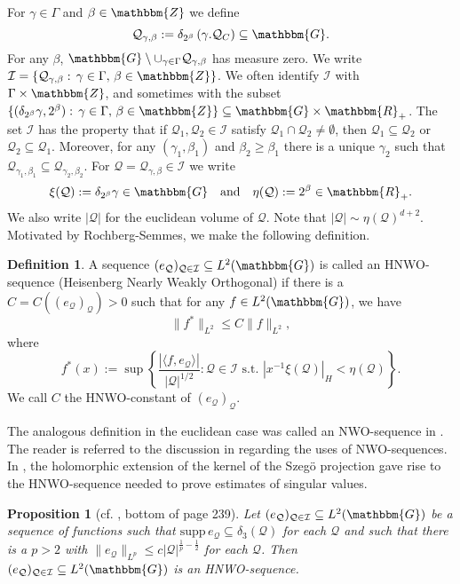 \documentclass[10pt]{amsart}
\newtheorem{prop}[thm]{Proposition}
\theoremstyle{remark}
\theoremstyle{definition}
\newtheorem{deef}[thm]{Definition}
\begin{document}
For $\gamma\in \Gamma$ and $\beta\in {\mathbbm{Z}}$ we define
$$\mathcal{Q}_{\gamma,\beta}:=\delta_{2^{\beta}}\left(\gamma.\mathcal{Q}_{C}\right)\subseteq \mathbbm{G}.$$
For any $\beta$, $\mathbbm{G}\setminus \cup_{\gamma\in \Gamma}\mathcal{Q}_{\gamma,\beta}$ has measure zero. We write $\mathcal{I}=\{\mathcal{Q}_{\gamma,\beta}: \,\gamma\in \Gamma, \,\beta\in {\mathbbm{Z}}\}$. We often identify $\mathcal{I}$ with $\Gamma\times {\mathbbm{Z}}$, and sometimes with the subset $\{(\delta_{2^\beta} \gamma,2^\beta): \,\gamma\in \Gamma, \,\beta\in {\mathbbm{Z}}\}\subseteq \mathbbm{G}\times {\mathbbm{R}}_+$. The set $\mathcal{I}$ has the property that if $\mathcal{Q}_1,\mathcal{Q}_2\in \mathcal{I}$ satisfy $\mathcal{Q}_1\cap \mathcal{Q}_2\neq \emptyset$, then $\mathcal{Q}_1\subseteq \mathcal{Q}_2$ or $\mathcal{Q}_2\subseteq \mathcal{Q}_1$. Moreover, for any $(\gamma_1,\beta_1)$ and $\beta_2\geq \beta_1$ there is a unique $\gamma_2$ such that $\mathcal{Q}_{\gamma_1,\beta_1}\subseteq \mathcal{Q}_{\gamma_2,\beta_2}$. For $\mathcal{Q}=\mathcal{Q}_{\gamma,\beta}\in \mathcal{I}$ we write
$$\xi(\mathcal{Q}):=\delta_{2^\beta} \gamma\in \mathbbm{G}\quad\mbox{and}\quad \eta(\mathcal{Q}):=2^\beta\in {\mathbbm{R}}_+.$$
We also write $|\mathcal{Q}|$ for the euclidean volume of $\mathcal{Q}$. Note that $|\mathcal{Q}|\sim \eta(\mathcal{Q})^{d+2}$. Motivated by Rochberg-Semmes, we make the following definition.

\begin{deef}
A sequence $(e_\mathcal{Q})_{\mathcal{Q}\in \mathcal{I}}\subseteq L^2(\mathbbm{G})$ is called an HNWO-sequence (Heisenberg Nearly Weakly Orthogonal) if there is a $C=C((e_\mathcal{Q})_\mathcal{Q})>0$ such that for any $f\in L^2(\mathbbm{G})$, we have 
$$\|f^*\|_{L^2}\leq C\|f\|_{L^2},$$
where 
$$f^*(x):=\sup\left\{ \frac{|\langle f,e_\mathcal{Q}\rangle|}{|\mathcal{Q}|^{1/2}}: \mathcal{Q}\in \mathcal{I} \mbox{  s.t.  }|x^{-1}\xi(\mathcal{Q})|_H<\eta(\mathcal{Q})\right\}.$$
We call $C$ the HNWO-constant of $(e_\mathcal{Q})_\mathcal{Q}$.
\end{deef}

The analogous definition in the euclidean case was called an NWO-sequence in \cite{rochbergsemmes}. The reader is referred to the discussion in \cite{rochbergsemmes} regarding the uses of NWO-sequences. In \cite{feldmanrochberg}, the holomorphic extension of the kernel of the Szeg\"o projection gave rise to the HNWO-sequence needed to prove estimates of singular values.

\begin{prop}[cf. \cite{rochbergsemmes}, bottom of page 239]
\label{lpboundsandhnwo}
Let $(e_\mathcal{Q})_{\mathcal{Q}\in \mathcal{I}}\subseteq L^2(\mathbbm{G})$ be a sequence of functions such that ${\mathrm{s} \mathrm{u} \mathrm{p} \mathrm{p}\,} e_{\mathcal{Q}}\subseteq \delta_3(\mathcal{Q})$ for each $\mathcal{Q}$ and such that there is a $p>2$ with $\|e_\mathcal{Q}\|_{L^p}\leq c|\mathcal{Q}|^{\frac{1}{p}-\frac{1}{2}}$ for each $\mathcal{Q}$. Then $(e_\mathcal{Q})_{\mathcal{Q}\in \mathcal{I}}\subseteq L^2(\mathbbm{G})$ is an HNWO-sequence.
\end{prop}
\end{document}

